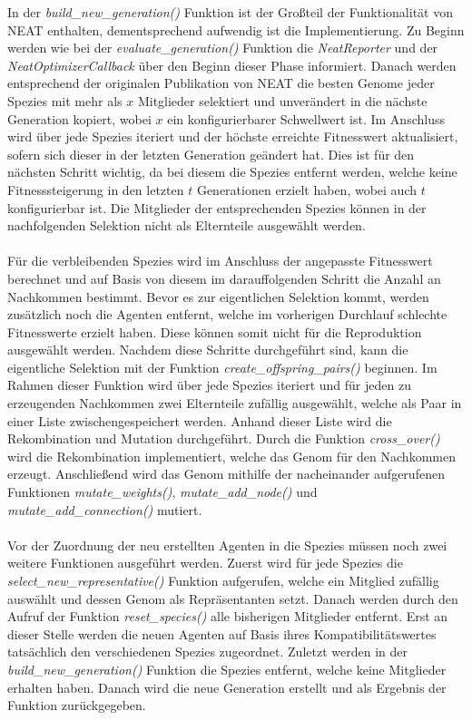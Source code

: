 In der \emph{build\_new\_generation()} Funktion ist der Großteil der Funktionalität von \ac{NEAT} enthalten, dementsprechend aufwendig ist die Implementierung. Zu Beginn werden wie bei der  \emph{evaluate\_generation()} Funktion die \emph{NeatReporter} und der \emph{NeatOptimizerCallback} über den Beginn dieser Phase informiert. Danach werden entsprechend der originalen Publikation von \ac{NEAT} die besten Genome jeder Spezies mit mehr als $x$ Mitglieder selektiert und unverändert in die nächste Generation kopiert, wobei $x$ ein konfigurierbarer Schwellwert ist. Im Anschluss wird über jede Spezies iteriert und der höchste erreichte Fitnesswert aktualisiert, sofern sich dieser in der letzten Generation geändert hat. Dies ist für den nächsten Schritt wichtig, da bei diesem die Spezies entfernt werden, welche keine Fitnesssteigerung in den letzten $t$ Generationen erzielt haben, wobei auch $t$ konfigurierbar ist. Die Mitglieder der entsprechenden Spezies können in der nachfolgenden Selektion nicht als Elternteile ausgewählt werden.
\\\\
Für die verbleibenden Spezies wird im Anschluss der angepasste Fitnesswert berechnet und auf Basis von diesem im darauffolgenden Schritt die Anzahl an Nachkommen bestimmt. Bevor es zur eigentlichen Selektion kommt, werden zusätzlich noch die Agenten entfernt, welche im vorherigen Durchlauf schlechte Fitnesswerte erzielt haben. Diese können somit nicht für die Reproduktion ausgewählt werden. Nachdem diese Schritte durchgeführt sind, kann die eigentliche Selektion mit der Funktion \emph{create\_offspring\_pairs()} beginnen. Im Rahmen dieser Funktion wird über jede Spezies iteriert und für jeden zu erzeugenden Nachkommen zwei Elternteile zufällig ausgewählt, welche als Paar in einer Liste zwischengespeichert werden. Anhand dieser Liste wird die Rekombination und Mutation durchgeführt. Durch die Funktion \emph{cross\_over()} wird die Rekombination implementiert, welche das Genom für den Nachkommen erzeugt. Anschließend wird das Genom mithilfe der nacheinander aufgerufenen Funktionen \emph{mutate\_weights()}, \emph{mutate\_add\_node()} und \emph{mutate\_add\_connection()} mutiert.
\\\\
Vor der Zuordnung der neu erstellten Agenten in die Spezies müssen noch zwei weitere Funktionen ausgeführt werden. Zuerst wird für jede Spezies die \emph{select\_new\_representative()} Funktion aufgerufen, welche ein Mitglied zufällig auswählt und dessen Genom als Repräsentanten setzt. Danach werden durch den Aufruf der Funktion \emph{reset\_species()} alle bisherigen Mitglieder entfernt. Erst an dieser Stelle werden die neuen Agenten auf Basis ihres Kompatibilitätswertes tatsächlich den verschiedenen Spezies zugeordnet. Zuletzt werden in der \emph{build\_new\_generation()} Funktion die Spezies entfernt, welche keine Mitglieder erhalten haben. Danach wird die neue Generation erstellt und als Ergebnis der Funktion zurückgegeben. 

